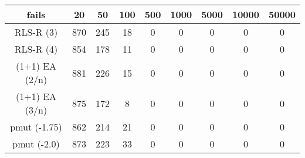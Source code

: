 \begin{tabular}[h]{ccccccccc}
fails&20&50&100&500&1000&5000&10000&50000\\\hline
RLS-R (3)&870&245&18&0&0&0&0&0\\
RLS-R (4)&854&178&11&0&0&0&0&0\\
(1+1) EA (2/n)&881&226&15&0&0&0&0&0\\
(1+1) EA (3/n)&875&172&8&0&0&0&0&0\\
pmut (-1.75)&862&214&21&0&0&0&0&0\\
pmut (-2.0)&873&223&33&0&0&0&0&0\\
\end{tabular}
